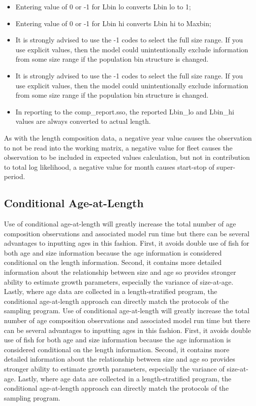 \begin{itemize}
	\item Entering value of 0 or -1 for Lbin lo converts Lbin lo to 1;
	\item Entering value of 0 or -1 for Lbin hi converts Lbin hi to Maxbin;
	\item It is strongly advised to use the -1 codes to select the full size range. If you use explicit values, then the model could unintentionally exclude information from some size range if the population bin structure is changed.
	\item It is strongly advised to use the -1 codes to select the full size range. If you use explicit values, then the model could unintentionally exclude information from some size range if the population bin structure is changed.
	\item In reporting to the comp\_report.sso, the reported Lbin\_lo and Lbin\_hi values are always converted to actual length.
\end{itemize}

As with the length composition data, a negative year value causes the observation to not be read into the working matrix, a negative value for fleet causes the observation to be included in expected values calculation, but not in contribution to total log likelihood, a negative value for month causes start-stop of super-period.


\subsection{Conditional Age-at-Length}
Use of conditional age-at-length will greatly increase the total number of age composition observations and associated model run time but there can be several advantages to inputting ages in this fashion. First, it avoids double use of fish for both age and size information because the age information is considered conditional on the length information. Second, it contains more detailed information about the relationship between size and age so provides stronger ability to estimate growth parameters, especially the variance of size-at-age. Lastly, where age data are collected in a length-stratified program, the conditional age-at-length approach can directly match the protocols of the sampling program.
Use of conditional age-at-length will greatly increase the total number of age composition observations and associated model run time but there can be several advantages to inputting ages in this fashion. First, it avoids double use of fish for both age and size information because the age information is considered conditional on the length information. Second, it contains more detailed information about the relationship between size and age so provides stronger ability to estimate growth parameters, especially the variance of size-at-age. Lastly, where age data are collected in a length-stratified program, the conditional age-at-length approach can directly match the protocols of the sampling program.

